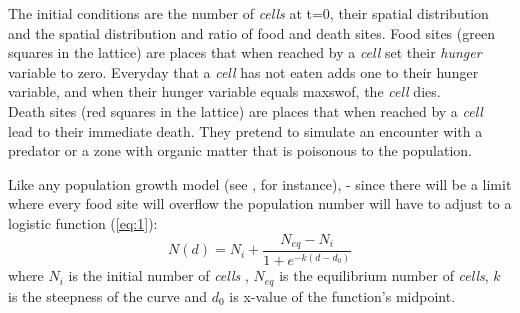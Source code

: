 \documentclass[a4paper,prd,twocolumn,nofootinbib,superscriptaddress,floatfix]{revtex4}
\begin{document}
\begin{table}[H]
\begin{center}
\end{center}
\caption{Set Up Variables}
\label{fitcaractvi}
\end{table}

The initial conditions are the number of \textit{cells} at t=0, their spatial distribution and the spatial distribution and ratio of food and death sites. Food sites (green squares in the lattice) are places that when reached by a \textit{cell} set their \textit{hunger} variable to zero. Everyday that a \textit{cell} has not eaten adds one to their hunger variable, and when their hunger variable equals maxswof, the \textit{cell} dies.\\
Death sites (red squares in the lattice) are places that when reached by a \textit{cell} lead to their immediate death. They pretend to simulate an encounter with a predator or a zone with organic matter that is poisonous to the population.

Like any population growth model (see \cite{logistic}, for instance),  - since there will be a limit where every food site will overflow the population number will have to adjust to a logistic function (\ref{eq:1}):\\


\begin{equation}
N(d)=N_i + \frac{N_{eq}-N_i}{1+e^{-k(d-d_0)}}
\label{eq:1}
\end{equation}
where  $N_i$ is the initial number of \textit{cells} , $N_{eq}$ is the equilibrium number of \textit{cells}, $k$ is the steepness of the curve and $d_0$ is x-value of the function's midpoint.\\
\end{document}

